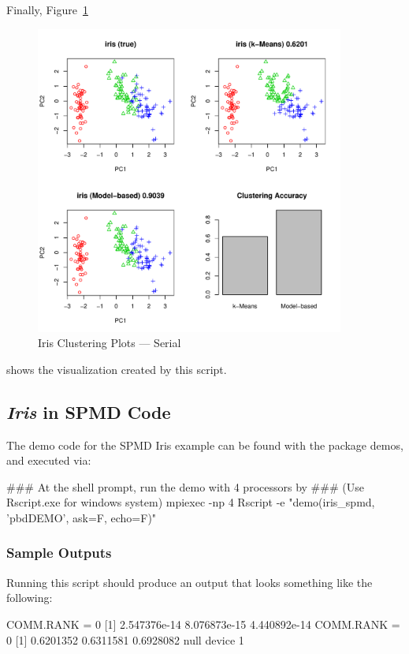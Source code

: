 Finally, Figure~\ref{fig:iris_cluster_serial}
\begin{figure}[h!bt]
  \centering
  \includegraphics[width=4in]{pbdDEMO-include/pics/serial_plot.pdf}
  \caption{Iris Clustering Plots --- Serial}
  \label{fig:iris_cluster_serial}
\end{figure}
shows the visualization created by this script.








\subsection{{\it Iris} in SPMD Code}

The demo code for the SPMD Iris example can be found with the package
demos, and executed via:
\begin{Command}
### At the shell prompt, run the demo with 4 processors by
### (Use Rscript.exe for windows system)
mpiexec -np 4 Rscript -e "demo(iris_spmd, 'pbdDEMO', ask=F, echo=F)"
\end{Command}

\subsubsection{Sample Outputs}
Running this script should produce an output that looks something like the following:
\begin{Output}
COMM.RANK = 0
[1] 2.547376e-14 8.076873e-15 4.440892e-14
COMM.RANK = 0
[1] 0.6201352 0.6311581 0.6928082
null device 
          1 
\end{Output}

